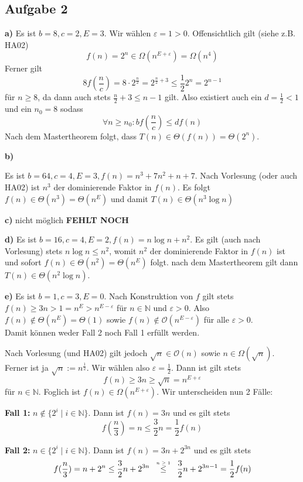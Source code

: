 \documentclass[a4paper,graphics,11pt]{article}
\newcommand{\aufgabe}[1]{\subsection*{Aufgabe #1}}
\newcommand{\up}[2]{\mathrel{\overset{\makebox[0pt]{\mbox{\normalfont\tiny #2}}}{#1}}}
\begin{document}
\newpage
\aufgabe{2}
\textbf{a)}
Es ist $b = 8, c = 2, E = 3$. Wir wählen $\varepsilon = 1 > 0$. Offensichtlich gilt (siehe z.B. HA02)
$$
    f(n) = 2^n \in \Omega(n^{E+\varepsilon}) = \Omega(n^4)
$$
Ferner gilt
$$
    8f\left(\frac{n}{c}\right)
    = 8\cdot 2^\frac{n}{2}
    = 2^{\frac{n}{2}+3}
    \leq \frac{1}{2} 2^n
    = 2^{n-1}
$$
für $n \geq 8$, da dann auch stets $\frac{n}{2} + 3 \leq n-1$ gilt. Also existiert auch ein $d = \frac{1}{2} < 1$ und ein $n_0 = 8$ sodass
$$
    \forall n \geq n_0 : bf(\frac{n}{c}) \leq df(n)
$$
Nach dem Mastertheorem folgt, dass $T(n) \in \Theta(f(n)) = \Theta(2^n)$.

\textbf{b)}

Es ist $b = 64, c = 4, E = 3, f(n) = n^3 + 7n^2 + n + 7$. Nach Vorlesung (oder auch HA02) ist $n^3$ der
dominierende Faktor in $f(n)$. Es folgt
$f(n) \in \Theta(n^3) = \Theta(n^E)$ und damit
$T(n) \in \Theta(n^3\log n)$

\textbf{c)}
nicht möglich
\textbf{FEHLT NOCH}

\textbf{d)}
Es ist $b = 16, c = 4, E = 2, f(n) = n\log n + n^2$.
Es gilt (auch nach Vorlesung) stets $n\log n \leq n^2$, womit $n^2$ der dominierende Faktor in $f(n)$ ist
und sofort $f(n) \in \Theta(n^2) = \Theta(n^E)$ folgt. nach dem Mastertheorem gilt dann
$T(n) \in \Theta(n^2\log n)$.

\textbf{e)}
Es ist $b = 1, c = 3, E = 0$.
Nach Konstruktion von $f$ gilt stets $f(n) \geq 3n > 1 = n^{E} > n^{E-\varepsilon}$ für $n \in \mathbb{N}$ und
$\varepsilon > 0$. Also $f(n) \notin \Theta(n^E) = \Theta(1)$ sowie $f(n) \notin \mathcal{O}(n^{E - \varepsilon})$ für alle $\varepsilon > 0$.\\
Damit können weder Fall 2 noch Fall 1 erfüllt werden.

Nach Vorlesung (und HA02) gilt jedoch $\sqrt{n} \in \mathcal{O}(n)$ sowie $n \in \Omega(\sqrt{n})$.
Ferner ist ja $\sqrt{n} := n^{\frac{1}{2}}$. Wir wählen also $\varepsilon = \frac{1}{2}$.
Dann ist gilt stets
$$
    f(n) \geq 3n \geq \sqrt{n} = n^{E+\varepsilon}
$$
für $n \in \mathbb{N}$.
Foglich ist $f(n) \in \Omega(n^{E+\varepsilon})$. Wir unterscheiden nun 2 Fälle:

\textbf{Fall 1:} $n \notin \{2^i \mid i \in \mathbb{N}\}$. Dann ist $f(n) = 3n$ und es gilt stets
$$
    f(\frac{n}{3}) = n \leq \frac{3}{2} n = \frac{1}{2} f(n)
$$

\textbf{Fall 2:} $n \in \{2^i \mid i\in \mathbb{N} \}$. Dann ist $f(n) = 3n + 2^{3n}$ und es gilt stets
$$ 
    f(\frac{n}{3}) = n+2^n
    \leq \frac{3}{2}n + 2^{3n}
    \quad\up{\leq}{$n \geq 1$}\quad \frac{3}{2}n + 2^{3n - 1}
    = \frac{1}{2} f(n)
$$
\end{document}
